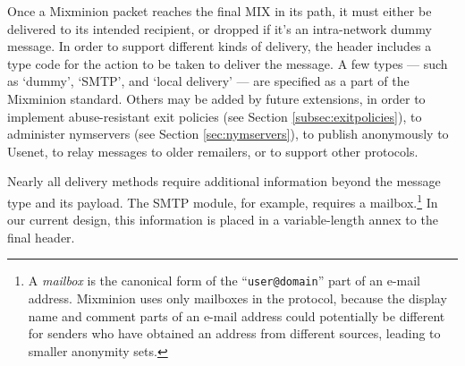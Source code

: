 \documentclass{llncs}
\begin{document}
Once a Mixminion packet reaches the final MIX in its path, it must
either be delivered to its intended recipient, or dropped if it's an
intra-network dummy message. In order to support different kinds of
delivery, the header includes a type code for the action to be taken
to deliver the message.  A few types --- such as `dummy', `SMTP', and
`local delivery' --- are specified as a part of the Mixminion
standard.  Others may be added by future extensions, in order to
implement abuse-resistant exit policies (see Section
\ref{subsec:exitpolicies}), to administer nymservers (see Section
\ref{sec:nymservers}), to publish anonymously to Usenet, to relay
messages to older remailers, or to support other protocols.

Nearly all delivery methods require additional information beyond the
message type and its payload.  The SMTP module, for example, requires
a mailbox.\footnote{A {\it mailbox} is the canonical form of the
``{\tt user@domain}'' part of an e-mail address. Mixminion uses only
mailboxes in the protocol, because the display name and comment parts
of an e-mail address could potentially be different for senders who
have obtained an address from different sources, leading to smaller
anonymity sets.}
In our current design, this information is placed
in a variable-length annex to the final header.

%
%
\end{document}
